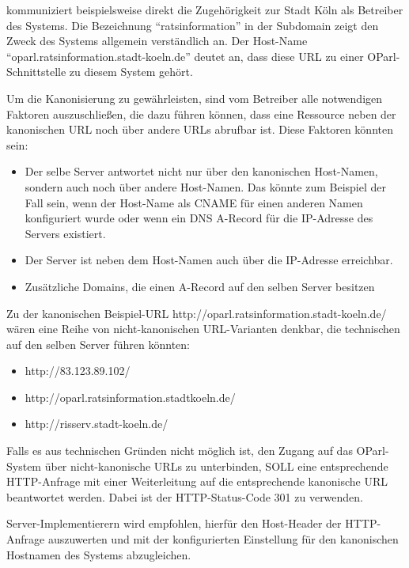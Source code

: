 \documentclass[,a4paper]{article}
\begin{document}
kommuniziert beispielsweise direkt die Zugehörigkeit zur Stadt Köln als
Betreiber des Systems. Die Bezeichnung ``ratsinformation'' in der
Subdomain zeigt den Zweck des Systems allgemein verständlich an. Der
Host-Name ``oparl.ratsinformation.stadt-koeln.de'' deutet an, dass diese
URL zu einer OParl-Schnittstelle zu diesem System gehört.

Um die Kanonisierung zu gewährleisten, sind vom Betreiber alle
notwendigen Faktoren auszuschließen, die dazu führen können, dass eine
Ressource neben der kanonischen URL noch über andere URLs abrufbar ist.
Diese Faktoren könnten sein:

\begin{itemize}
\item
  Der selbe Server antwortet nicht nur über den kanonischen Host-Namen,
  sondern auch noch über andere Host-Namen. Das könnte zum Beispiel der
  Fall sein, wenn der Host-Name als CNAME für einen anderen Namen
  konfiguriert wurde oder wenn ein DNS A-Record für die IP-Adresse des
  Servers existiert.
\item
  Der Server ist neben dem Host-Namen auch über die IP-Adresse
  erreichbar.
\item
  Zusätzliche Domains, die einen A-Record auf den selben Server besitzen
\end{itemize}

Zu der kanonischen Beispiel-URL
http://oparl.ratsinformation.stadt-koeln.de/ wären eine Reihe von
nicht-kanonischen URL-Varianten denkbar, die technischen auf den selben
Server führen könnten:

\begin{itemize}
\itemsep1pt\parskip0pt
\item
  http://83.123.89.102/
\item
  http://oparl.ratsinformation.stadtkoeln.de/
\item
  http://risserv.stadt-koeln.de/
\end{itemize}

Falls es aus technischen Gründen nicht möglich ist, den Zugang auf das
OParl-System über nicht-kanonische URLs zu unterbinden, SOLL eine
entsprechende HTTP-Anfrage mit einer Weiterleitung auf die entsprechende
kanonische URL beantwortet werden. Dabei ist der HTTP-Status-Code 301 zu
verwenden.

Server-Implementierern wird empfohlen, hierfür den Host-Header der
HTTP-Anfrage auszuwerten und mit der konfigurierten Einstellung für den
kanonischen Hostnamen des Systems abzugleichen.
\end{document}
